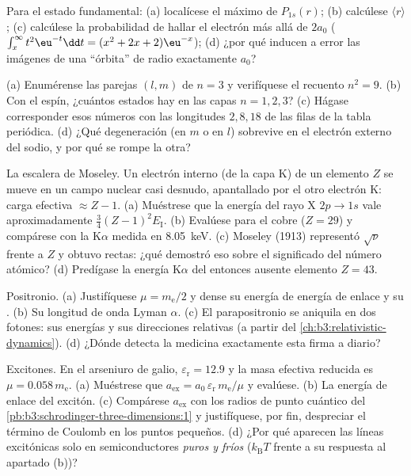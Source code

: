 \begin{exercise}[$\star$]\label{exo:b3:hydrogen-atom:3}
Para el estado fundamental: (a) localícese el máximo de $P_{1s}(r)$; (b)
calcúlese $\langle r\rangle$; (c) calcúlese la probabilidad de hallar el
electrón más allá de $2a_0$ ($\int_x^\infty t^2\eu^{-t}\dd t = (x^2 +
2x + 2)\eu^{-x}$); (d) ¿por qué inducen a error las imágenes de una
``órbita'' de radio exactamente $a_0$?
\end{exercise}

\begin{exercise}[$\star$]\label{exo:b3:hydrogen-atom:4}
(a) Enumérense las parejas $(l, m)$ de $n = 3$ y verifíquese el recuento $n^2 =
9$. (b) Con el espín, ¿cuántos estados hay en las capas $n = 1, 2, 3$? (c)
Hágase corresponder esos números con las longitudes $2, 8, 18$ de las filas de
la tabla periódica. (d) ¿Qué degeneración (en $m$ o en $l$) sobrevive en el
electrón externo del sodio, y por qué se rompe la otra?
\end{exercise}

\begin{exercise}[$\star\star$]\label{exo:b3:hydrogen-atom:5}
La escalera de Moseley. Un electrón interno (de la capa K) de un elemento
$Z$ se mueve en un campo nuclear casi desnudo, apantallado por el otro
electrón K: carga efectiva $\approx Z - 1$. (a) Muéstrese que la energía
del rayo X $2p \to 1s$ vale aproximadamente $\tfrac34(Z-1)^2E_{\text{I}}$.
(b) Evalúese para el cobre ($Z = 29$) y compárese con la K$\alpha$ medida en
\qty{8.05}{keV}. (c) Moseley (1913) representó
$\sqrt{\nu}$ frente a $Z$ y obtuvo rectas: ¿qué demostró eso sobre el
significado del número atómico? (d) Predígase la energía K$\alpha$
del entonces ausente elemento $Z = 43$.
\end{exercise}

\begin{exercise}[$\star\star$]\label{exo:b3:hydrogen-atom:6}
Positronio. (a) Justifíquese $\mu = m_{\text{e}}/2$ y dense su energía de
energía de enlace y su . (b) Su longitud de onda Lyman $\alpha$.
(c) El parapositronio se aniquila en dos fotones: sus energías
y sus direcciones relativas (a partir del \cref{ch:b3:relativistic-dynamics}).
(d) ¿Dónde detecta la medicina exactamente esta firma a diario?
\end{exercise}

\begin{exercise}[$\star\star$]\label{exo:b3:hydrogen-atom:7}
Excitones. En el arseniuro de galio, $\varepsilon_{\text{r}} = 12.9$ y
la masa efectiva reducida es $\mu = 0.058\,m_{\text{e}}$. (a) Muéstrese que
$a_{\text{ex}} = a_0\,\varepsilon_{\text{r}}\,m_{\text{e}}/\mu$ y
evalúese. (b) La energía de enlace del excitón. (c) Compárese
$a_{\text{ex}}$ con los radios de punto cuántico del
\cref{pb:b3:schrodinger-three-dimensions:1} y justifíquese, por fin,
despreciar el término de Coulomb en los puntos pequeños. (d) ¿Por qué
aparecen las líneas excitónicas solo en semiconductores \emph{puros y
fríos} ($k_{\text{B}}T$ frente a su respuesta al apartado (b))?
\end{exercise}

